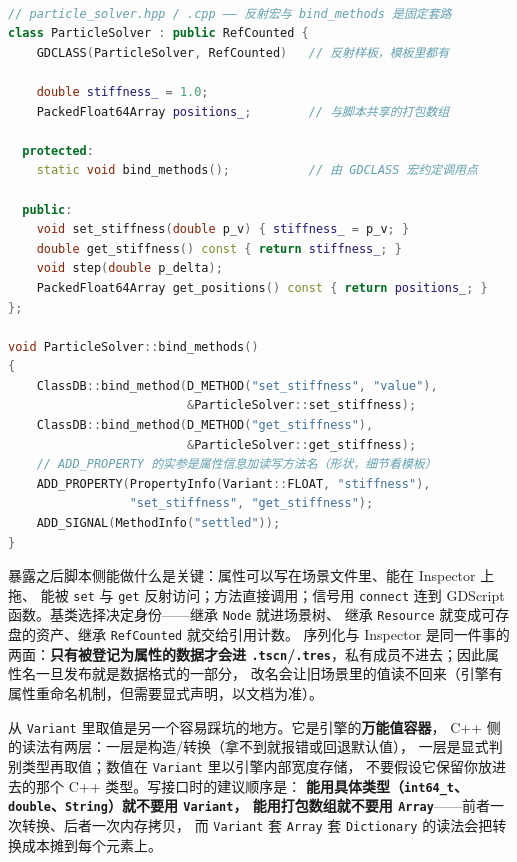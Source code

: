 \documentclass[12pt,a4paper,fontset=fandol]{ctexbook}
\newcommand{\Tp}[1]{\texttt{#1}}
\newcommand{\Bk}{\discretionary{}{}{}}
\newcommand{\Lang}[1]{\textsf{#1}}
\newcommand{\CPP}{\Lang{C++}}
\begin{document}
\begin{lstlisting}[language=C++, style=cppstyle, caption={把一个类暴露给脚本与 Inspector：方法、属性、信号三件事}, label={lst:ch12-class}, framexleftmargin=12pt, framexrightmargin=12pt]

// particle_solver.hpp / .cpp —— 反射宏与 bind_methods 是固定套路
class ParticleSolver : public RefCounted {
    GDCLASS(ParticleSolver, RefCounted)   // 反射样板，模板里都有

    double stiffness_ = 1.0;
    PackedFloat64Array positions_;        // 与脚本共享的打包数组

  protected:
    static void bind_methods();           // 由 GDCLASS 宏约定调用点

  public:
    void set_stiffness(double p_v) { stiffness_ = p_v; }
    double get_stiffness() const { return stiffness_; }
    void step(double p_delta);
    PackedFloat64Array get_positions() const { return positions_; }
};

void ParticleSolver::bind_methods()
{
    ClassDB::bind_method(D_METHOD("set_stiffness", "value"),
                         &ParticleSolver::set_stiffness);
    ClassDB::bind_method(D_METHOD("get_stiffness"),
                         &ParticleSolver::get_stiffness);
    // ADD_PROPERTY 的实参是属性信息加读写方法名（形状，细节看模板）
    ADD_PROPERTY(PropertyInfo(Variant::FLOAT, "stiffness"),
                 "set_stiffness", "get_stiffness");
    ADD_SIGNAL(MethodInfo("settled"));
}
\end{lstlisting}

暴露之后脚本侧能做什么是关键：属性可以写在场景文件里、能在 Inspector 上拖、
能被 \Tp{set} 与 \Tp{get} 反射访问；方法直接调用；信号用 \Tp{connect} 连到
\Lang{GDScript} 函数。基类选择决定身份——继承 \Tp{Node} 就进场景树、
继承 \Tp{Resource} 就变成可存盘的资产、继承 \Tp{RefCounted} 就交给引用计数。
序列化与 Inspector 是同一件事的两面：\textbf{只有被登记为属性的数据才会进
\Tp{.tscn}/{\Bk}\Tp{.tres}}，私有成员不进去；因此属性名一旦发布就是数据格式的一部分，
改名会让旧场景里的值读不回来（引擎有属性重命名机制，但需要显式声明，以文档为准）。

从 \Tp{Variant} 里取值是另一个容易踩坑的地方。它是引擎的\textbf{万能值容器}，
C++ 侧的读法有两层：一层是构造/转换（拿不到就报错或回退默认值），
一层是显式判别类型再取值；数值在 \Tp{Variant} 里以引擎内部宽度存储，
不要假设它保留你放进去的那个 \CPP{} 类型。写接口时的建议顺序是：
\textbf{能用具体类型（\Tp{int64\_t}、\Tp{double}、\Tp{String}）就不要用 \Tp{Variant}，
能用打包数组就不要用 \Tp{Array}}——前者一次转换、后者一次内存拷贝，
而 \Tp{Variant} 套 \Tp{Array} 套 \Tp{Dictionary} 的读法会把转换成本摊到每个元素上。
\end{document}

